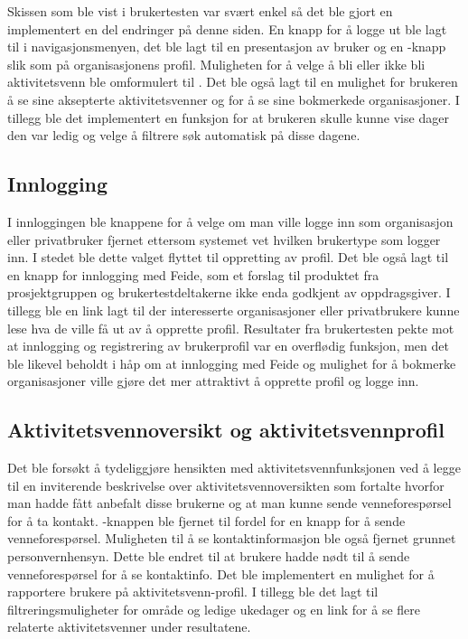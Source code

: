 Skissen som ble vist i brukertesten var svært enkel så det ble gjort en implementert en del endringer på denne siden. En knapp for å logge ut ble lagt til i navigasjonsmenyen, det ble lagt til en presentasjon av bruker og en -knapp slik som på organisasjonens profil. Muligheten for å velge å bli eller ikke bli aktivitetsvenn ble omformulert til . Det ble også lagt til en mulighet for brukeren å se sine aksepterte aktivitetsvenner og for å se sine bokmerkede organisasjoner. I tillegg ble det implementert en funksjon for at brukeren skulle kunne vise dager den var ledig og velge å filtrere søk automatisk på disse dagene.

\subsection{Innlogging}
 I innloggingen ble knappene for å velge om man ville logge inn som organisasjon eller privatbruker fjernet ettersom systemet vet hvilken brukertype som logger inn. I stedet ble dette valget flyttet til oppretting av profil. Det ble også lagt til en knapp for innlogging med Feide, som et forslag til produktet fra prosjektgruppen og brukertestdeltakerne ikke enda godkjent av oppdragsgiver. I tillegg ble en link lagt til der interesserte organisasjoner eller privatbrukere kunne lese hva de ville få ut av å opprette profil. Resultater fra brukertesten pekte mot at innlogging og registrering av brukerprofil var en overflødig funksjon, men det ble likevel beholdt i håp om at innlogging med Feide og mulighet for å bokmerke organisasjoner ville gjøre det mer attraktivt å opprette profil og logge inn.

 
 \subsection{Aktivitetsvennoversikt og aktivitetsvennprofil}
 
 Det ble forsøkt å tydeliggjøre hensikten med aktivitetsvennfunksjonen ved å legge til en inviterende beskrivelse over aktivitetsvennoversikten som fortalte hvorfor man hadde fått anbefalt disse brukerne og at man kunne sende venneforespørsel for å ta kontakt. -knappen ble fjernet til fordel for en knapp for å sende venneforespørsel. Muligheten til å se kontaktinformasjon ble også fjernet grunnet personvernhensyn. Dette ble endret til at brukere hadde nødt til å sende venneforespørsel for å se kontaktinfo. Det ble implementert en mulighet for å rapportere brukere på aktivitetsvenn-profil. I tillegg ble det lagt til filtreringsmuligheter for område og ledige ukedager og en link for å se flere relaterte aktivitetsvenner under resultatene.
 
